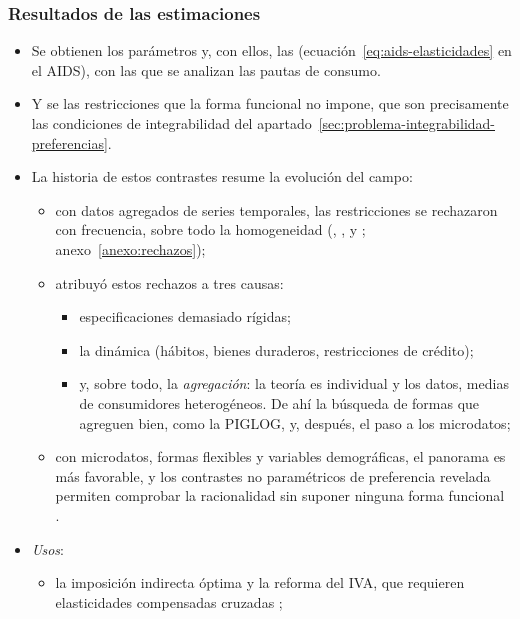 \documentclass[11pt]{article}
\begin{document}
\subsubsection{Resultados de las estimaciones}\label{sec:resultados-estimaciones}

\begin{itemize}
\item Se obtienen los parámetros y, con ellos, las  (ecuación~\eqref{eq:aids-elasticidades} en el AIDS), con las que se analizan las pautas de consumo.
\item Y se  las restricciones que la forma funcional no impone, que son precisamente las condiciones de integrabilidad del apartado~\ref{sec:problema-integrabilidad-preferencias}.
\item La historia de estos contrastes resume la evolución del campo\nocite{AguilarMateos2015Deaton}:
  \begin{itemize}
  \item con datos agregados de series temporales, las restricciones se rechazaron con frecuencia, sobre todo la homogeneidad (, ,  y ; anexo~\ref{anexo:rechazos});
  \item {} atribuyó estos rechazos a tres causas\nocite{DeatonMuellbauer1980Economics}:
    \begin{itemize}
    \item especificaciones demasiado rígidas;
    \item la dinámica (hábitos, bienes duraderos, restricciones de crédito);
    \item y, sobre todo, la \emph{agregación}: la teoría es individual y los datos, medias de consumidores heterogéneos. De ahí la búsqueda de formas que agreguen bien, como la PIGLOG, y, después, el paso a los microdatos;
    \end{itemize}
  \item con microdatos, formas flexibles y variables demográficas, el panorama es más favorable, y los contrastes no paramétricos de preferencia revelada permiten comprobar la racionalidad sin suponer ninguna forma funcional\nocite{BlundellBrowningCrawford2003Nonparametric} .
  \end{itemize}
\item \emph{Usos}:
  \begin{itemize}
  \item la imposición indirecta óptima y la reforma del IVA, que requieren elasticidades compensadas cruzadas ;

\end{itemize}
\end{itemize}
\end{document}

